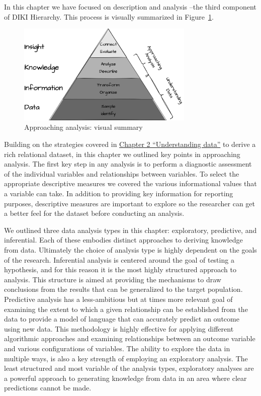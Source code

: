 \documentclass[
  letterpaper,
  DIV=11,
  numbers=noendperiod]{scrreport}
\theoremstyle{definition}
\theoremstyle{remark}
\begin{document}

In this chapter we have focused on description and analysis --the third
component of DIKI Hierarchy. This process is visually summarized in
Figure~\ref{fig-approaching-analysis-vis-sum}.

\begin{figure}[H]

{\centering \includegraphics[width=0.75\textwidth,height=\textheight]{figures/aa-diki.drawio.png}

}

\caption{\label{fig-approaching-analysis-vis-sum}Approaching analysis:
visual summary}

\end{figure}

Building on the strategies covered in
\protect\hyperlink{sec-understanding-data}{Chapter 2 ``Understanding
data''} to derive a rich relational dataset, in this chapter we outlined
key points in approaching analysis. The first key step in any analysis
is to perform a diagnostic assessment of the individual variables and
relationships between variables. To select the appropriate descriptive
measures we covered the various informational values that a variable can
take. In addition to providing key information for reporting purposes,
descriptive measures are important to explore so the researcher can get
a better feel for the dataset before conducting an analysis.

We outlined three data analysis types in this chapter: exploratory,
predictive, and inferential. Each of these embodies distinct approaches
to deriving knowledge from data. Ultimately the choice of analysis type
is highly dependent on the goals of the research. Inferential analysis
is centered around the goal of testing a hypothesis, and for this reason
it is the most highly structured approach to analysis. This structure is
aimed at providing the mechanisms to draw conclusions from the results
that can be generalized to the target population. Predictive analysis
has a less-ambitious but at times more relevant goal of examining the
extent to which a given relationship can be established from the data to
provide a model of language that can accurately predict an outcome using
new data. This methodology is highly effective for applying different
algorithmic approaches and examining relationships between an outcome
variable and various configurations of variables. The ability to explore
the data in multiple ways, is also a key strength of employing an
exploratory analysis. The least structured and most variable of the
analysis types, exploratory analyses are a powerful approach to
generating knowledge from data in an area where clear predictions cannot
be made.
\end{document}
